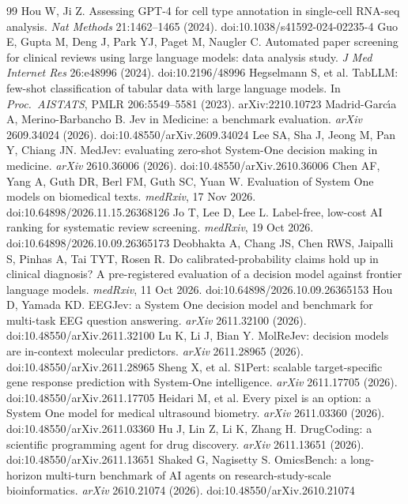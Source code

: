 \documentclass[10pt,twocolumn]{article}
\begin{document}
\begin{thebibliography}{99}
 Hou W, Ji Z. Assessing GPT-4 for cell type annotation in single-cell RNA-seq analysis. \emph{Nat Methods} 21:1462--1465 (2024). doi:10.1038/s41592-024-02235-4
 Guo E, Gupta M, Deng J, Park YJ, Paget M, Naugler C. Automated paper screening for clinical reviews using large language models: data analysis study. \emph{J Med Internet Res} 26:e48996 (2024). doi:10.2196/48996
 Hegselmann S, et al. TabLLM: few-shot classification of tabular data with large language models. In \emph{Proc.\ AISTATS}, PMLR 206:5549--5581 (2023). arXiv:2210.10723
 Madrid-Garc\'{\i}a A, Merino-Barbancho B. Jev in Medicine: a benchmark evaluation. \emph{arXiv} 2609.34024 (2026). doi:10.48550/arXiv.2609.34024
 Lee SA, Sha J, Jeong M, Pan Y, Chiang JN. MedJev: evaluating zero-shot System-One decision making in medicine. \emph{arXiv} 2610.36006 (2026). doi:10.48550/arXiv.2610.36006
 Chen AF, Yang A, Guth DR, Berl FM, Guth SC, Yuan W. Evaluation of System One models on biomedical texts. \emph{medRxiv}, 17 Nov 2026. doi:10.64898/2026.11.15.26368126
 Jo T, Lee D, Lee L. Label-free, low-cost AI ranking for systematic review screening. \emph{medRxiv}, 19 Oct 2026. doi:10.64898/2026.10.09.26365173
 Deobhakta A, Chang JS, Chen RWS, Jaipalli S, Pinhas A, Tai TYT, Rosen R. Do calibrated-probability claims hold up in clinical diagnosis? A pre-registered evaluation of a decision model against frontier language models. \emph{medRxiv}, 11 Oct 2026. doi:10.64898/2026.10.09.26365153
 Hou D, Yamada KD. EEGJev: a System One decision model and benchmark for multi-task EEG question answering. \emph{arXiv} 2611.32100 (2026). doi:10.48550/arXiv.2611.32100
 Lu K, Li J, Bian Y. MolReJev: decision models are in-context molecular predictors. \emph{arXiv} 2611.28965 (2026). doi:10.48550/arXiv.2611.28965
 Sheng X, et al. S1Pert: scalable target-specific gene response prediction with System-One intelligence. \emph{arXiv} 2611.17705 (2026). doi:10.48550/arXiv.2611.17705
 Heidari M, et al. Every pixel is an option: a System One model for medical ultrasound biometry. \emph{arXiv} 2611.03360 (2026). doi:10.48550/arXiv.2611.03360
 Hu J, Lin Z, Li K, Zhang H. DrugCoding: a scientific programming agent for drug discovery. \emph{arXiv} 2611.13651 (2026). doi:10.48550/arXiv.2611.13651
 Shaked G, Nagisetty S. OmicsBench: a long-horizon multi-turn benchmark of AI agents on research-study-scale bioinformatics. \emph{arXiv} 2610.21074 (2026). doi:10.48550/arXiv.2610.21074

\end{thebibliography}
\end{document}
